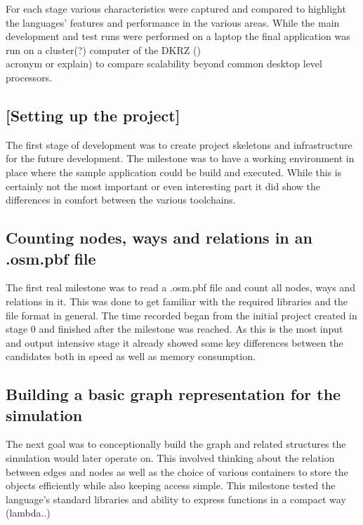 For each stage various characteristics were captured and compared to highlight the languages' features and performance in the various areas. While the main development and test runs were performed on a laptop the final application was run on a cluster(?) computer of the DKRZ ()\\acronym or explain) to compare scalability beyond common desktop level processors.

\setcounter{subsection}{-1}

\subsection{[Setting up the project]}
\label{subsec:Approach::Implementation::Setup}

The first stage of development was to create project skeletons and infrastructure for the future development. The milestone was to have a working environment in place where the sample application could be build and executed. While this is certainly not the most important or even interesting part it did show the differences in comfort between the various toolchains.

\subsection{Counting nodes, ways and relations in an .osm.pbf file}
\label{subsec:Approach::Implementation::Counting}

The first real milestone was to read a .osm.pbf file and count all nodes, ways and relations in it. This was done to get familiar with the required libraries and the file format in general. The time recorded began from the initial project created in stage 0 and finished after the milestone was reached. As this is the most input and output intensive stage it already showed some key differences between the candidates both in speed as well as memory consumption.

\subsection{Building a basic graph representation for the simulation}
\label{subsec:Approach::Implementation::Graph_Representation}

The next goal was to conceptionally build the graph and related structures the simulation would later operate on. This involved thinking about the relation between edges and nodes as well as the choice of various containers to store the objects efficiently while also keeping access simple. This milestone tested the language's standard libraries and ability to express functions in a compact way (lambda..)

